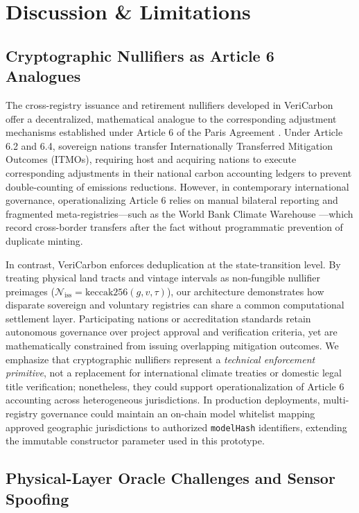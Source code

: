 \documentclass[preprint,12pt]{elsarticle}
\begin{document}
\section{Discussion \& Limitations}

\subsection{Cryptographic Nullifiers as Article 6 Analogues}

The cross-registry issuance and retirement nullifiers developed in VeriCarbon offer a decentralized, mathematical analogue to the corresponding adjustment mechanisms established under Article 6 of the Paris Agreement \cite{unfccc2021article6}. Under Article 6.2 and 6.4, sovereign nations transfer Internationally Transferred Mitigation Outcomes (ITMOs), requiring host and acquiring nations to execute corresponding adjustments in their national carbon accounting ledgers to prevent double-counting of emissions reductions. However, in contemporary international governance, operationalizing Article 6 relies on manual bilateral reporting and fragmented meta-registries—such as the World Bank Climate Warehouse \cite{worldbank2022warehouse}—which record cross-border transfers after the fact without programmatic prevention of duplicate minting.

In contrast, VeriCarbon enforces deduplication at the state-transition level. By treating physical land tracts and vintage intervals as non-fungible nullifier preimages ($\mathcal{N}_{\text{iss}} = \text{keccak256}(g, v, \tau)$), our architecture demonstrates how disparate sovereign and voluntary registries can share a common computational settlement layer. Participating nations or accreditation standards retain autonomous governance over project approval and verification criteria, yet are mathematically constrained from issuing overlapping mitigation outcomes. We emphasize that cryptographic nullifiers represent a \textit{technical enforcement primitive}, not a replacement for international climate treaties or domestic legal title verification; nonetheless, they could support operationalization of Article 6 accounting across heterogeneous jurisdictions. In production deployments, multi-registry governance could maintain an on-chain model whitelist mapping approved geographic jurisdictions to authorized \texttt{modelHash} identifiers, extending the immutable constructor parameter used in this prototype.

\subsection{Physical-Layer Oracle Challenges and Sensor Spoofing}
\end{document}
